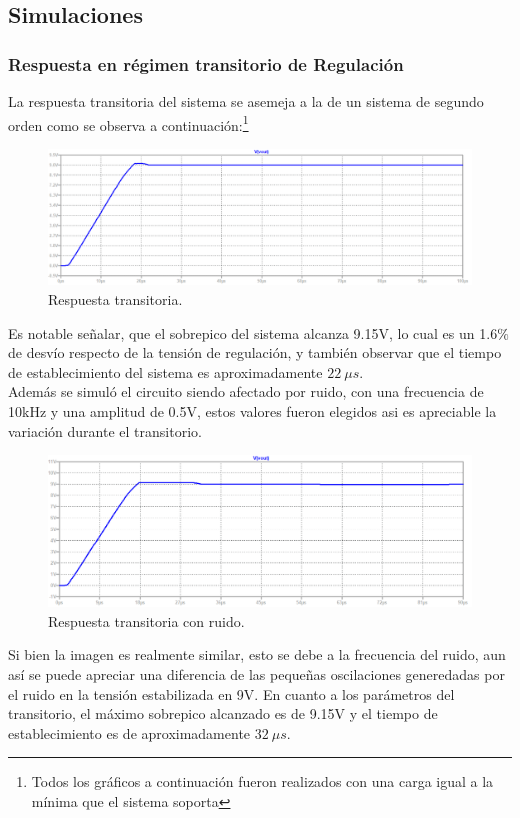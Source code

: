 \subsection{Simulaciones}
\subsubsection{Respuesta en régimen transitorio de Regulación}
La respuesta transitoria del sistema se asemeja a la de un sistema de segundo orden como se observa a continuación:\footnote{Todos los gráficos a continuación fueron realizados con una carga igual a la mínima que el sistema soporta}
\begin{figure}[H]
\centering
	\includegraphics[width=1\textwidth]{ImagenesEjercicio2/transresp.png}
	\caption{Respuesta transitoria.}
	\label{fig:transitorioFuente}
\end{figure}
Es notable señalar, que el sobrepico del sistema alcanza 9.15V, lo cual es un 1.6$\%$ de desvío respecto de la tensión de regulación, y también observar que el tiempo de establecimiento del sistema es aproximadamente $22 \ \mu s$.\\
Además se simuló el circuito siendo afectado por ruido, con una frecuencia de 10kHz y una amplitud de 0.5V, estos valores fueron elegidos asi es apreciable la variación  durante el transitorio.
\begin{figure}[H]
\centering
	\includegraphics[width=1\textwidth]{ImagenesEjercicio2/transrespnoise.png}
	\caption{Respuesta transitoria con ruido.}
	\label{fig:transitorioFuentenoise}
\end{figure}
Si bien la imagen es realmente similar, esto se debe a la frecuencia del ruido, aun así se puede apreciar una diferencia de las pequeñas oscilaciones generedadas por el ruido en la tensión estabilizada en 9V. En cuanto a los parámetros del transitorio, el máximo sobrepico alcanzado es de 9.15V y el tiempo de establecimiento es de aproximadamente $32 \ \mu s$.
